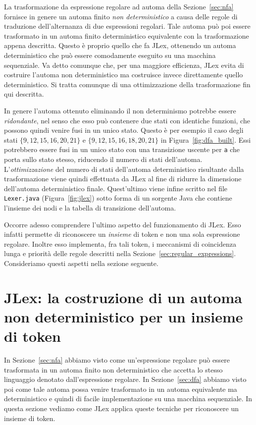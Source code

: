 La trasformazione da espressione regolare ad automa della Sezione~\ref{sec:nfa}
fornisce in genere un automa finito \emph{non deterministico} a causa
delle regole di traduzione dell'alternanza di due espressioni regolari.
Tale automa pu\`o poi essere trasformato in un automa finito deterministico
equivalente con la trasformazione appena descritta. Questo \`e proprio
quello che fa JLex, ottenendo un automa deterministico che pu\`o
essere \piu comodamente eseguito su una macchina sequenziale.
Va detto comunque che, per una maggiore efficienza, JLex
evita di costruire l'automa non deterministico ma costruisce invece
direttamente quello deterministico. Si tratta comunque di una ottimizzazione
della trasformazione fin qui descritta.

In genere l'automa ottenuto eliminando il
non determinismo potrebbe essere \emph{ridondante}, nel senso che
esso pu\`o contenere due stati con identiche funzioni, che possono quindi
venire fusi in un unico stato. Questo \`e per
esempio il caso degli stati $\{9,12,15,16,20,21\}$ e
$\{9,12,15,16,18,20,21\}$ in Figura~\ref{fig:dfa_built}. Essi potrebbero essere
fusi in un unico stato con una transizione uscente per \texttt{a} che porta
sullo stato stesso, riducendo il numero di stati dell'automa.
L'\emph{ottimizzazione} del numero di stati dell'automa deterministico
risultante dalla trasformazione viene quindi effettuata da JLex
al fine di ridurre la dimensione dell'automa deterministico finale.
Quest'ultimo viene infine scritto nel file \texttt{Lexer.java}
(Figura~\ref{fig:jlex}) sotto forma di un sorgente Java che contiene
l'insieme dei nodi e la tabella di transizione dell'automa.

Occorre adesso comprendere l'ultimo aspetto del funzionamento di JLex.
Esso infatti permette di riconoscere un \emph{insieme} di token e non una
sola espressione regolare. Inoltre esso implementa, fra tali token,
i meccanismi di coincidenza \piu lunga e priorit\`a delle regole
descritti nella Sezione~\ref{sec:regular_expressions}.
Consideriamo questi aspetti nella sezione seguente.
%
\section{JLex: la costruzione di un automa non deterministico per un insieme di token}\label{sec:jlex_for_tokens}
%
In Sezione~\ref{sec:nfa} abbiamo visto come un'espressione regolare pu\`o
essere trasformata in un automa finito non deterministico che accetta lo
stesso linguaggio denotato dall'espressione regolare. In Sezione~\ref{sec:dfa}
abbiamo visto poi come tale automa possa venire trasformato in un automa
equivalente ma deterministico e quindi di \piu facile implementazione su una
macchina sequenziale. In questa sezione vediamo come JLex applica
queste tecniche per riconoscere un insieme di token.

